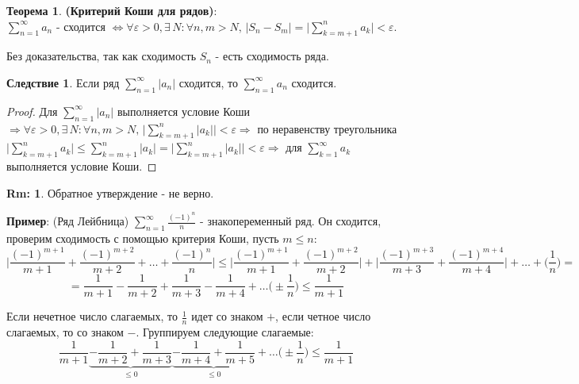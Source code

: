 \documentclass[12pt]{article}
\theoremstyle{definition}
\newtheorem{rem}{Rm:}
\newtheorem{theorem}{Теорема}
\newtheorem{corollary}{Следствие}
\begin{document}

\begin{theorem}\textbf{(Критерий Коши для рядов)}:\\
	$\displaystyle \sum\limits_{n=1}^{\infty} a_n$ - сходится $\Leftrightarrow \forall \varepsilon >0, \exists \, N \colon \forall n,m > N, \, |S_n - S_m| = \Bigg|\displaystyle \sum\limits_{k = m+1}^{n}{a_k}\Bigg|  < \varepsilon$.
\end{theorem}

Без доказательства, так как сходимость $S_n$ - есть сходимость ряда.

\begin{corollary}
	Если ряд $\displaystyle \sum\limits_{n=1}^{\infty} |a_n|$ сходится, то  $\displaystyle \sum\limits_{n=1}^{\infty} a_n$ сходится.
\end{corollary}

\begin{proof}
	Для $\displaystyle \sum\limits_{n=1}^{\infty} |a_n|$ выполняется условие Коши $\Rightarrow \forall \varepsilon > 0, \exists \, N \colon \forall n, m > N, \,
	\Bigg|\displaystyle \sum\limits_{k = m+1}^{n} |a_k| \Bigg| < \varepsilon \Rightarrow$ по неравенству треугольника $\Bigg|\displaystyle \sum\limits_{k = m+1}^{n} a_k \Bigg| \leq \displaystyle \sum\limits_{k = m+1}^{n} |a_k| = \Bigg|\displaystyle \sum\limits_{k = m+1}^{n} |a_k| \Bigg| < \varepsilon \Rightarrow$ для $\displaystyle \sum\limits_{k = 1}^{\infty} a_k$ выполняется условие Коши.
\end{proof}

\begin{rem}
	Обратное утверждение - не верно.
\end{rem}

\textbf{Пример}: (Ряд Лейбница) $\displaystyle \sum\limits_{n=1}^{\infty} \frac{(-1)^n}{n}$ - знакопеременный ряд. Он сходится, проверим сходимость с помощью критерия Коши, пусть $m\leq n$: $$\bigg| \dfrac{(-1)^{m+1}}{m+1} + \dfrac{(-1)^{m+2}}{m+2} + \dotsc + \dfrac{(-1)^n}{n} \bigg| \leq \bigg|\dfrac{(-1)^{m+1}}{m+1} + \dfrac{(-1)^{m+2}}{m+2} \bigg| + \bigg|\dfrac{(-1)^{m+3}}{m+3} + \dfrac{(-1)^{m+4}}{m+4} \bigg| + \dotsc + \bigg(\dfrac{1}{n} \bigg)=$$ 
$$= \dfrac{1}{m+1} - \dfrac{1}{m+2} + \dfrac{1}{m+3} - \dfrac{1}{m+4} + \dotsc \bigg(\pm \dfrac{1}{n} \bigg) \leq \dfrac{1}{m+1}$$ 

Если нечетное число слагаемых, то $\frac{1}{n}$ идет со знаком $+$, если четное число слагаемых, то со знаком $-$.
Группируем следующие слагаемые:
$$\dfrac{1}{m+1} \underbrace{ - \dfrac{1}{m+2} + \dfrac{1}{m+3}}_{\leq 0} \underbrace{- \dfrac{1}{m+4} + \dfrac{1}{m+5}}_{\leq 0}+ \dotsc \bigg(\pm \dfrac{1}{n} \bigg) \leq \dfrac{1}{m+1}$$
\end{document}

